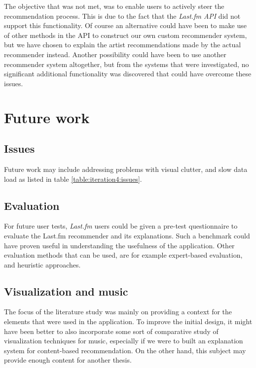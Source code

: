The objective that was not met, was to enable users to actively steer the recommendation process. This is due to the fact that the \emph{Last.fm API} did not support this functionality. Of course an alternative could have been to make use of other methods in the API to construct our own custom recommender system, but we have chosen to explain the artist recommendations made by the actual recommender instead. Another possibility could have been to use another recommender system altogether, but from the systems that were investigated, no significant additional functionality was discovered that could have overcome these issues.



\section{Future work}

\subsection{Issues}

Future work may include addressing problems with visual clutter, and slow data load as listed in table \ref{table:iteration4:issues}.


\subsection{Evaluation}

For future user tests, \emph{Last.fm} users could be given a pre-test questionnaire to evaluate the Last.fm recommender and its explanations. Such a benchmark could have proven useful in understanding the usefulness of the application. Other evaluation methods that can be used, are for example expert-based evaluation, and heuristic approaches.


\subsection{Visualization and music}

The focus of the literature study was mainly on providing a context for the elements that were used in the application. To improve the initial design, it might have been better to also incorporate some sort of comparative study of visualization techniques for music, especially if we were to built an explanation system for content-based recommendation. On the other hand, this subject may provide enough content for another thesis.


